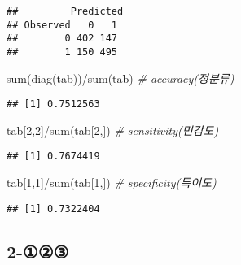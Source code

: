 \documentclass[
]{article}
\newenvironment{Shaded}{\begin{snugshade}}{\end{snugshade}}
\newcommand{\AttributeTok}[1]{\textcolor[rgb]{0.77,0.63,0.00}{#1}}
\newcommand{\CommentTok}[1]{\textcolor[rgb]{0.56,0.35,0.01}{\textit{#1}}}
\newcommand{\DecValTok}[1]{\textcolor[rgb]{0.00,0.00,0.81}{#1}}
\newcommand{\FunctionTok}[1]{\textcolor[rgb]{0.00,0.00,0.00}{#1}}
\newcommand{\NormalTok}[1]{#1}
\newcommand{\OtherTok}[1]{\textcolor[rgb]{0.56,0.35,0.01}{#1}}
\newcommand{\SpecialCharTok}[1]{\textcolor[rgb]{0.00,0.00,0.00}{#1}}
\newcommand{\StringTok}[1]{\textcolor[rgb]{0.31,0.60,0.02}{#1}}
\begin{document}
\begin{Shaded}
\end{Shaded}

\begin{verbatim}
##         Predicted
## Observed   0   1
##        0 402 147
##        1 150 495
\end{verbatim}

\begin{Shaded}
\begin{Highlighting}[]
\FunctionTok{sum}\NormalTok{(}\FunctionTok{diag}\NormalTok{(tab))}\SpecialCharTok{/}\FunctionTok{sum}\NormalTok{(tab) }\CommentTok{\# accuracy(정분류)}
\end{Highlighting}
\end{Shaded}

\begin{verbatim}
## [1] 0.7512563
\end{verbatim}

\begin{Shaded}
\begin{Highlighting}[]
\NormalTok{tab[}\DecValTok{2}\NormalTok{,}\DecValTok{2}\NormalTok{]}\SpecialCharTok{/}\FunctionTok{sum}\NormalTok{(tab[}\DecValTok{2}\NormalTok{,])   }\CommentTok{\# sensitivity(민감도)}
\end{Highlighting}
\end{Shaded}

\begin{verbatim}
## [1] 0.7674419
\end{verbatim}

\begin{Shaded}
\begin{Highlighting}[]
\NormalTok{tab[}\DecValTok{1}\NormalTok{,}\DecValTok{1}\NormalTok{]}\SpecialCharTok{/}\FunctionTok{sum}\NormalTok{(tab[}\DecValTok{1}\NormalTok{,])   }\CommentTok{\# specificity(특이도)}
\end{Highlighting}
\end{Shaded}

\begin{verbatim}
## [1] 0.7322404
\end{verbatim}

\hypertarget{section-5}{%
\subsection{2-①②③}\label{section-5}}
\end{document}
